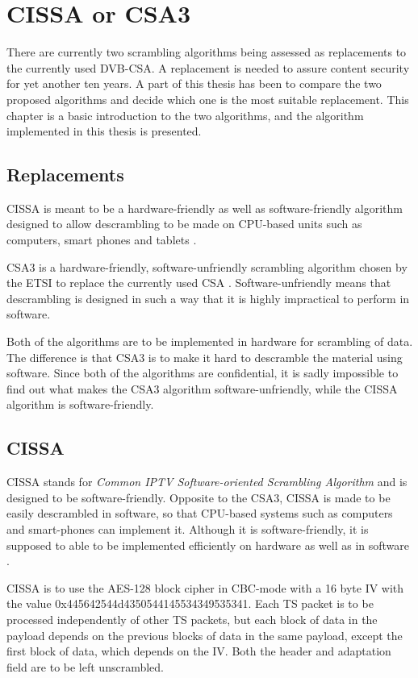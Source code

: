 \chapter{CISSA or CSA3}\label{ch:csa3cissa}
There are currently two scrambling algorithms being assessed as 
replacements to the currently used DVB-CSA. A replacement is 
needed to assure content security for yet another ten years.
A part of this thesis has been to compare the two proposed 
algorithms and decide which one is the most suitable replacement.
This chapter is a basic introduction to the two algorithms, and 
the algorithm implemented in this thesis is presented.

\section{Replacements}
CISSA is meant to be a hardware-friendly as well as software-friendly 
algorithm designed to allow descrambling to be made on CPU-based units 
such as computers, smart phones and tablets \citep[p. 9]{DVB:2013}.

CSA3 is a hardware-friendly, software-unfriendly scrambling algorithm 
chosen by the ETSI to replace the currently used CSA 
\citep[pp. 6--7]{DVB:2013}. Software-unfriendly means that descrambling 
is designed in such a way that it is highly impractical to perform in 
software.

Both of the algorithms are to be implemented in hardware for 
scrambling of data. The difference is that CSA3 is to make it hard to 
descramble the material using software. Since both of the algorithms 
are confidential, it is sadly impossible to find out what makes the 
CSA3 algorithm software-unfriendly, while the CISSA algorithm is 
software-friendly. 

\section{CISSA}
CISSA stands for \emph{Common IPTV Software-oriented Scrambling 
Algorithm} and is designed to be software-friendly. Opposite to the 
CSA3, CISSA is made to be easily descrambled in software, so that 
CPU-based systems such as computers and smart-phones can implement 
it.  Although it is software-friendly, it is supposed to able to 
be implemented efficiently on hardware as well as in software 
\citep[p. 9]{DVB:2013}.

CISSA is to use the AES-128 block cipher in CBC-mode with a 16 byte 
IV with the value 0x445642544d4350544145534349535341. Each TS packet 
is to be processed independently of other TS packets, but each block 
of data in the payload depends on the previous blocks of data in the 
same payload, except the first block of data, which depends on the IV. 
Both the header and adaptation field are to be left unscrambled. 
\citep[p. 11]{DVB:2013}

